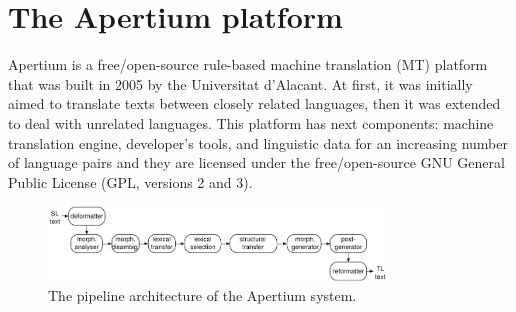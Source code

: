 \documentclass[11pt]{article}
\begin{document}
\section{The Apertium platform}
Apertium \citep{forcada11} is a free/open-source rule-based machine translation (MT) platform that was built in 2005 by the Universitat d’Alacant. At first, it was initially aimed to translate texts between closely related languages, then it was extended to deal with unrelated languages. This platform has next components: machine translation engine, developer’s tools, and linguistic data for an increasing number of language pairs and they are licensed under the free/open-source GNU General Public License (GPL, versions 2 and 3).

\begin{figure}[htbp]
\begin{center}
 \includegraphics[width=0.8\textwidth]{architecture.pdf}
\end{center}
\caption{The pipeline architecture of the Apertium system.}
\label{fig:modules}
\end{figure}
\end{document}
